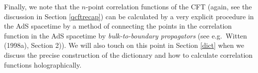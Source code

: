 \documentclass[12pt]{article}
\renewcommand{\^}[1]{\hat{#1}}
\begin{document}
Finally, we note that the $n$-point correlation functions of the CFT (again, see the discussion in Section \ref{qcftrecap}) can be calculated by a very explicit procedure in the AdS spacetime by a method of connecting the points in the correlation function in the AdS spacetime by \emph{bulk-to-boundary propagators} (see e.g.~Witten (1998a), Section 2)). We will also touch on this point in Section \ref{dict} when we discuss the precise construction of the dictionary and how to calculate correlation functions holographically.
\end{document}
